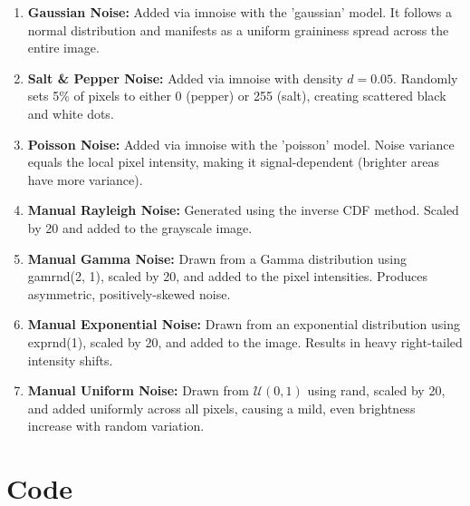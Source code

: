 \documentclass[12pt,a4paper]{article}
\begin{document}
\begin{enumerate}
  \item \textbf{Gaussian Noise:} Added via imnoise with the 'gaussian' model.
        It follows a normal distribution and manifests as a uniform graininess spread across the entire image.

  \item \textbf{Salt \& Pepper Noise:} Added via imnoise with density $d = 0.05$.
        Randomly sets 5\% of pixels to either 0 (pepper) or 255 (salt),
        creating scattered black and white dots.

  \item \textbf{Poisson Noise:} Added via imnoise with the 'poisson' model.
        Noise variance equals the local pixel intensity, making it
        signal-dependent (brighter areas have more variance).

  \item \textbf{Manual Rayleigh Noise:} Generated using the inverse CDF method.
        Scaled by 20 and added to the grayscale image.

  \item \textbf{Manual Gamma Noise:} Drawn from a Gamma distribution using
        gamrnd(2, 1), scaled by 20, and added to the pixel intensities.
        Produces asymmetric, positively-skewed noise.

  \item \textbf{Manual Exponential Noise:} Drawn from an exponential distribution
        using exprnd(1), scaled by 20, and added to the image.
        Results in heavy right-tailed intensity shifts.

  \item \textbf{Manual Uniform Noise:} Drawn from $\mathcal{U}(0,1)$ using rand,
        scaled by 20, and added uniformly across all pixels, causing a
        mild, even brightness increase with random variation.
\end{enumerate}


\section{Code}
\end{document}
